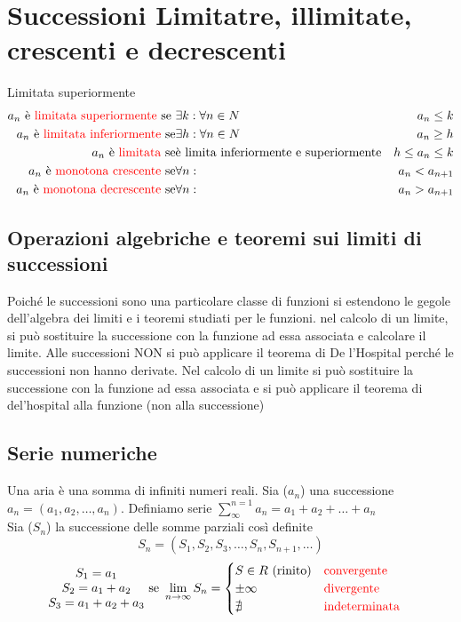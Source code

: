 \section{Successioni Limitatre, illimitate, crescenti e decrescenti}
Limitata superiormente
\begin{eqnarray*}
  a_n \text{ è {\color{red} limitata superiormente} se } & \exists k:\forall n \in N
  & a_n\leq k\\
  a_n \text{ è {\color{red} limitata inferiormente} se} & \exists h: \forall n\in N
  & a_n \geq h\\
  a_n \text{ è {\color{red} limitata} se} & \text{è limita inferiormente e superiormente}
  & h\leq a_n\leq k\\
  a_n \text{ è {\color{red}monotona crescente} se} & \forall n: & a_n < a_{n+1}\\
  a_n \text{ è {\color{red}monotona decrescente} se} & \forall n: & a_n > a_{n+1}
\end{eqnarray*}
\clearpage
\subsection{Operazioni algebriche e teoremi sui limiti di successioni}
\begin{defi}
	Poiché le successioni sono una particolare classe di funzioni si estendono
	le gegole dell'algebra dei limiti e i teoremi studiati per le funzioni.
	nel calcolo di un limite, si può sostituire la successione con la funzione
	ad essa associata e calcolare il limite. Alle successioni {\color{red}NON}
	si può applicare il teorema di De l'Hospital perché le successioni non
	hanno derivate. Nel calcolo di un limite si può sostituire la successione
	con la funzione ad essa associata e si può applicare il teorema di
	del'hospital alla funzione (non alla successione)
\end{defi}
\subsection{Serie numeriche}
Una {\color{red}aria} è una somma di infiniti numeri reali. Sia ($a_n$) una
successione $a_n=(a_1,a_2, \dots,a_n)$. Definiamo {\color{red}serie
$\displaystyle\sum_{\infty}^{n=1}a_n=a_1+a_2+\dots+a_n$}\\
Sia ($S_n$) la successione delle somme parziali così definite
\begin{equation*}
	S_n=(S_1,S_2,S_3,\dots,S_n,S_{n+1},\dots)
\end{equation*}
\begin{eqnarray*}
	\begin{matrix}
		S_1=a_1\\
		S_2=a_1+a_2\\
		S_3=a_1+a_2+a_3
	\end{matrix} &\text{ se }\lim\limits_{n\to\infty}S_n=\begin{cases}
		S\in R\text{ (rinito)} & \text{\color{red}convergente}\\
		\pm \infty & \text{\color{red}divergente}\\
		\nexists &\text{\color{red}indeterminata}
	\end{cases}
\end{eqnarray*}
